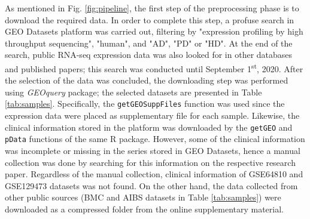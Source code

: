 As mentioned in Fig. \ref{fig:pipeline}, the first step of the preprocessing phase is to download the required data. In order to complete this step, a profuse search in GEO Datasets platform was carried out, filtering by "expression profiling by high throughput sequencing", "human", and "AD", "PD" or "HD". At the end of the search, public RNA-seq expression data was also looked for in other databases and published papers; this search was conducted until September 1\textsuperscript{st}, 2020. After the selection of the data was concluded, the downloading step was performed using \textit{GEOquery} package; the selected datasets are presented in Table \ref{tab:samples}. Specifically, the \verb|getGEOSuppFiles| function was used since the expression data were placed as supplementary file for each sample. Likewise, the clinical information stored in the platform was downloaded by the \verb|getGEO| and \verb|pData| functions of the same R package. However, some of the clinical information was incomplete or missing in the series stored in GEO Datasets, hence a manual collection was done by searching for this information on the respective research paper. Regardless of the manual collection, clinical information of GSE64810 and GSE129473 datasets was not found. On the other hand, the data collected from other public sources (BMC and AIBS datasets in Table \ref{tab:samples}) were downloaded as a compressed folder from the online supplementary material.

